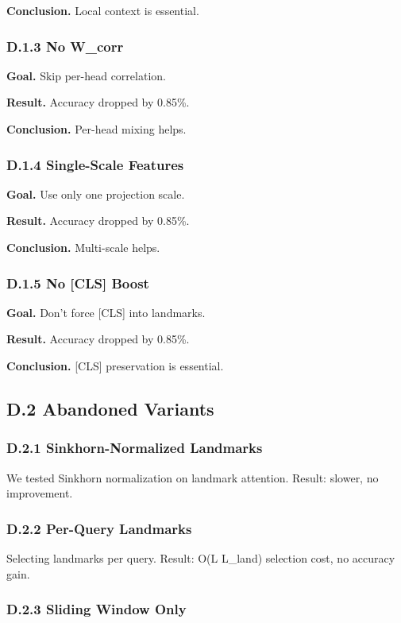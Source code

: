 \textbf{Conclusion.} Local context is essential.

\subsubsection{D.1.3 No W\_corr}

\textbf{Goal.} Skip per-head correlation.

\textbf{Result.} Accuracy dropped by 0.85\%.

\textbf{Conclusion.} Per-head mixing helps.

\subsubsection{D.1.4 Single-Scale Features}

\textbf{Goal.} Use only one projection scale.

\textbf{Result.} Accuracy dropped by 0.85\%.

\textbf{Conclusion.} Multi-scale helps.

\subsubsection{D.1.5 No [CLS] Boost}

\textbf{Goal.} Don't force [CLS] into landmarks.

\textbf{Result.} Accuracy dropped by 0.85\%.

\textbf{Conclusion.} [CLS] preservation is essential.

\subsection{D.2 Abandoned Variants}

\subsubsection{D.2.1 Sinkhorn-Normalized Landmarks}

We tested Sinkhorn normalization on landmark attention. Result: slower, 
no improvement.

\subsubsection{D.2.2 Per-Query Landmarks}

Selecting landmarks per query. Result: O(L L\_land) selection cost, no 
accuracy gain.

\subsubsection{D.2.3 Sliding Window Only}

